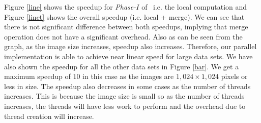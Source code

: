 Figure \ref{line} shows the speedup for {\em Phase-$I$} of \paremsp\ i.e. 
the local computation and Figure \ref{linet} shows the overall speedup (i.e.
local + merge). We can see that there is not significant difference between both speedups, implying that merge operation
does not have a significant overhead. 
Also as can be seen from the graph, as the image size increases, speedup also
increases. Therefore, our parallel implementation is able to achieve near linear
speed for large data sets. We have also shown the speedup for all the other data sets in Figure \ref{bar}.
We get a maximum speedup of $10$ in this case as the images are $1,024 \times
1,024$ pixels or less in size. The speedup also decreases in some cases as the
number of threads increases.
This is because the image size is small so as the number of threads increases,
the threads will have less work to perform and the overhead due to thread
creation will increase.


